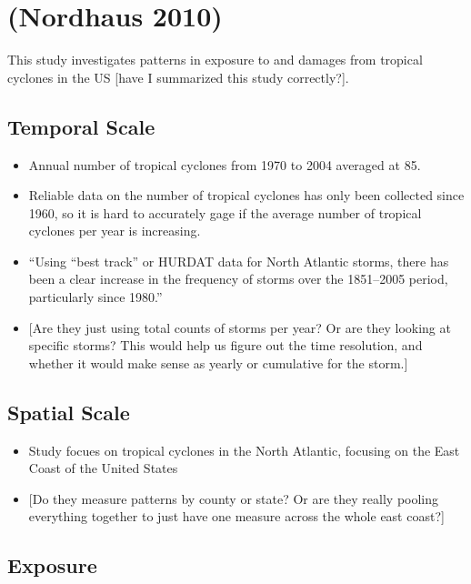 \documentclass[
]{article}
\providecommand{\tightlist}{%
  \setlength{\itemsep}{0pt}\setlength{\parskip}{0pt}}
\begin{document}
\hypertarget{nordhaus2010economics}{%
\section{(Nordhaus 2010)}\label{nordhaus2010economics}}

This study investigates patterns in exposure to and damages from
tropical cyclones in the US {[}have I summarized this study
correctly?{]}.

\hypertarget{temporal-scale-19}{%
\subsection{Temporal Scale}\label{temporal-scale-19}}

\begin{itemize}
\tightlist
\item
  Annual number of tropical cyclones from 1970 to 2004 averaged at 85.
\item
  Reliable data on the number of tropical cyclones has only been
  collected since 1960, so it is hard to accurately gage if the average
  number of tropical cyclones per year is increasing.
\item
  ``Using ``best track'' or HURDAT data for North Atlantic storms, there
  has been a clear increase in the frequency of storms over the
  1851--2005 period, particularly since 1980.''
\item
  {[}Are they just using total counts of storms per year? Or are they
  looking at specific storms? This would help us figure out the time
  resolution, and whether it would make sense as yearly or cumulative
  for the storm.{]}
\end{itemize}

\hypertarget{spatial-scale-19}{%
\subsection{Spatial Scale}\label{spatial-scale-19}}

\begin{itemize}
\tightlist
\item
  Study focues on tropical cyclones in the North Atlantic, focusing on
  the East Coast of the United States
\item
  {[}Do they measure patterns by county or state? Or are they really
  pooling everything together to just have one measure across the whole
  east coast?{]}
\end{itemize}

\hypertarget{exposure-18}{%
\subsection{Exposure}\label{exposure-18}}
\end{document}
